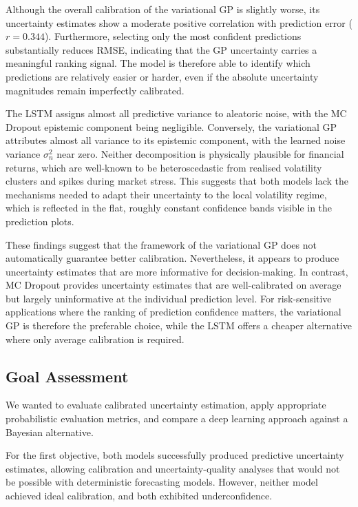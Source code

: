 Although the overall calibration of the variational GP is slightly worse, its uncertainty estimates show a moderate positive correlation with prediction error ($r = 0.344$). Furthermore, selecting only the most confident predictions substantially reduces RMSE, indicating that the GP uncertainty carries a meaningful ranking signal. The model is therefore able to identify which predictions are relatively easier or harder, even if the absolute uncertainty magnitudes remain imperfectly calibrated.

The LSTM assigns almost all predictive variance to aleatoric noise, with the MC Dropout epistemic component being negligible. Conversely, the variational GP attributes almost all variance to its epistemic component, with the learned noise variance $\sigma_n^2$ near zero. Neither decomposition is physically plausible for financial returns, which are well-known to be heteroscedastic from realised volatility clusters and spikes during market stress. This suggests that both models lack the mechanisms needed to adapt their uncertainty to the local volatility regime, which is reflected in the flat, roughly constant confidence bands visible in the prediction plots.

These findings suggest that the framework of the variational GP does not automatically guarantee better calibration. Nevertheless, it appears to produce uncertainty estimates that are more informative for decision-making. In contrast, MC Dropout provides uncertainty estimates that are well-calibrated on average but largely uninformative at the individual prediction level. For risk-sensitive applications where the ranking of prediction confidence matters, the variational GP is therefore the preferable choice, while the LSTM offers a cheaper alternative where only average calibration is required.

\subsection{Goal Assessment}

We wanted to evaluate calibrated uncertainty estimation, apply appropriate probabilistic evaluation metrics, and compare a deep learning approach against a Bayesian alternative.

For the first objective, both models successfully produced predictive uncertainty estimates, allowing calibration and uncertainty-quality analyses that would not be possible with deterministic forecasting models. However, neither model achieved ideal calibration, and both exhibited underconfidence. 

